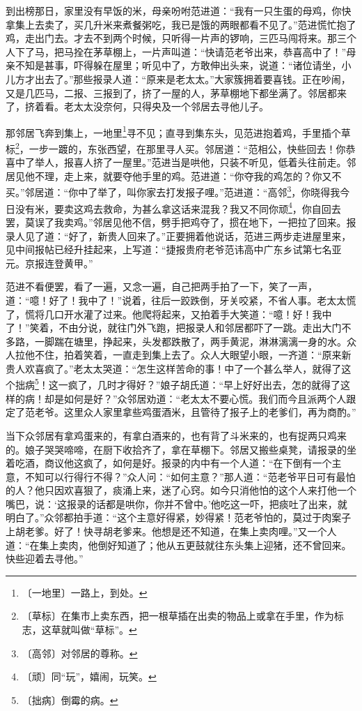 \documentclass[12pt,UTF-8,openany]{ctexbook}
\begin{document}
\begin{normalsize}
    到出榜那日，家里没有早饭的米，母亲吩咐范进道：“我有一只生蛋的母鸡，你快拿集上去卖了，买几升米来煮餐粥吃，我已是饿的两眼都看不见了。”范进慌忙抱了鸡，走出门去。才去不到两个时候，只听得一片声的锣响，三匹马闯将来。那三个人下了马，把马拴在茅草棚上，一片声叫道：“快请范老爷出来，恭喜高中了！”母亲不知是甚事，吓得躲在屋里；听见中了，方敢伸出头来，说道：“诸位请坐，小儿方才出去了。”那些报录人道：“原来是老太太。”大家簇拥着要喜钱。正在吵闹，又是几匹马，二报、三报到了，挤了一屋的人，茅草棚地下都坐满了。邻居都来了，挤着看。老太太没奈何，只得央及一个邻居去寻他儿子。
    
    那邻居飞奔到集上，一地里\footnote{〔一地里〕一路上，到处。}寻不见；直寻到集东头，见范进抱着鸡，手里插个草标\footnote{〔草标〕在集市上卖东西，把一根草插在出卖的物品上或拿在手里，作为标志，这草就叫做“草标”。}，一步一踱的，东张西望，在那里寻人买。邻居道：“范相公，快些回去！你恭喜中了举人，报喜人挤了一屋里。”范进当是哄他，只装不听见，低着头往前走。邻居见他不理，走上来，就要夺他手里的鸡。范进道：“你夺我的鸡怎的？你又不买。”邻居道：“你中了举了，叫你家去打发报子哩。”范进道：“高邻\footnote{〔高邻〕对邻居的尊称。}，你晓得我今日没有米，要卖这鸡去救命，为甚么拿这话来混我？我又不同你顽\footnote{〔顽〕同“玩”，嬉闹，玩笑。}，你自回去罢，莫误了我卖鸡。”邻居见他不信，劈手把鸡夺了，掼在地下，一把拉了回来。报录人见了道：“好了，新贵人回来了。”正要拥着他说话，范进三两步走进屋里来，见中间报帖已经升挂起来，上写道：“捷报贵府老爷范讳高中广东乡试第七名亚元。京报连登黄甲。”
    
    范进不看便罢，看了一遍，又念一遍，自己把两手拍了一下，笑了一声，道：“噫！好了！我中了！”说着，往后一跤跌倒，牙关咬紧，不省人事。老太太慌了，慌将几口开水灌了过来。他爬将起来，又拍着手大笑道：“噫！好！我中了！”笑着，不由分说，就往门外飞跑，把报录人和邻居都吓了一跳。走出大门不多路，一脚踹在塘里，挣起来，头发都跌散了，两手黄泥，淋淋漓漓一身的水。众人拉他不住，拍着笑着，一直走到集上去了。众人大眼望小眼，一齐道：“原来新贵人欢喜疯了。”老太太哭道：“怎生这样苦命的事！中了一个甚么举人，就得了这个拙病\footnote{〔拙病〕倒霉的病。}！这一疯了，几时才得好？”娘子胡氏道：“早上好好出去，怎的就得了这样的病！却是如何是好？”众邻居劝道：“老太太不要心慌。我们而今且派两个人跟定了范老爷。这里众人家里拿些鸡蛋酒米，且管待了报子上的老爹们，再为商酌。”
    
    当下众邻居有拿鸡蛋来的，有拿白酒来的，也有背了斗米来的，也有捉两只鸡来的。娘子哭哭啼啼，在厨下收拾齐了，拿在草棚下。邻居又搬些桌凳，请报录的坐着吃酒，商议他这疯了，如何是好。报录的内中有一个人道：“在下倒有一个主意，不知可以行得行不得？”众人问：“如何主意？”那人道：“范老爷平日可有最怕的人？他只因欢喜狠了，痰涌上来，迷了心窍。如今只消他怕的这个人来打他一个嘴巴，说：‘这报录的话都是哄你，你并不曾中。’他吃这一吓，把痰吐了出来，就明白了。”众邻都拍手道：“这个主意好得紧，妙得紧！范老爷怕的，莫过于肉案子上胡老爹。好了！快寻胡老爹来。他想是还不知道，在集上卖肉哩。”又一个人道：“在集上卖肉，他倒好知道了；他从五更鼓就往东头集上迎猪，还不曾回来。快些迎着去寻他。”
    

\end{normalsize}
\end{document}
